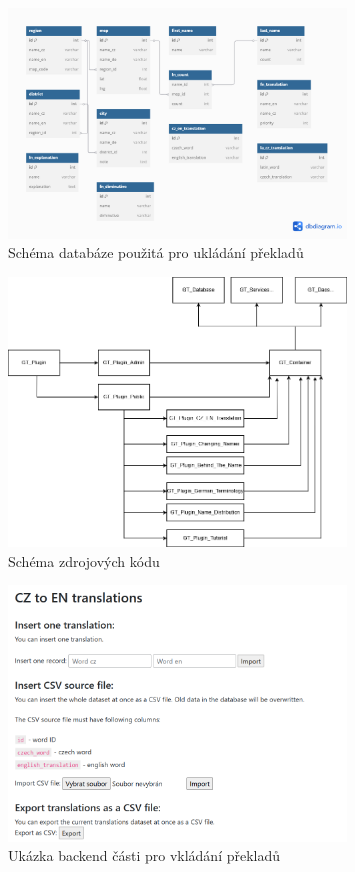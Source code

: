 \documentclass[czech, ba, kiv, he]{fasthesis}
\begin{document}
\begin{figure}[h]  
    \centering  
    \includegraphics[width=0.8\textwidth]{database.png}  
    \caption{Schéma databáze použitá pro ukládání překladů}  
\end{figure}

\begin{figure}[h]  
    \centering  
    \includegraphics[width=0.8\textwidth]{genealogy_components.png}  
    \caption{Schéma zdrojových kódu}  
\end{figure}

\begin{figure}[h]  
    \centering  
    \includegraphics[width=0.8\textwidth]{plugin_backend.png}  
    \caption{Ukázka backend části pro vkládání překladů}  
\end{figure}
\end{document}
